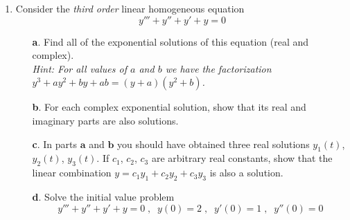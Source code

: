 \documentclass[10pt,psamsfonts,reqno,oneside,letterpaper]{amsart}
\begin{document}
\begin{enumerate}[I]
\item Consider the \emph{third order} linear homogeneous equation
	\[ y''' + y'' + y' + y = 0 \]
	\begin{enumerate}
		\item[\textbf{a}.] Find all of the exponential solutions of this equation (real and complex). \\
		\textit{Hint: For all values of $a$ and $b$ we have the factorization $y^3 + ay^2 + by + ab = (y+a)(y^2+b)$. }
		\item[\textbf{b}.] For each complex exponential solution, show that its real and imaginary parts are also solutions. 
		\item[\textbf{c}.] In parts $\textbf{a}$ and $\textbf{b}$ you should have obtained three real solutions $y_1(t)$, $y_2(t)$, $y_3(t)$.  If $c_1$, $c_2$, $c_3$ are arbitrary real constants, show that the linear combination $y = c_1 y_1 + c_2 y_2 + c_3 y_3$ is also a solution.
		\item[\textbf{d}.] Solve the initial value problem 
		\[ y''' + y'' + y' + y = 0 \; , \; \; y(0) = 2 \; , \; \; y'(0) = 1\; , \; \; y''(0) = 0 \]
	\end{enumerate}
	

\end{enumerate}
\end{document}
